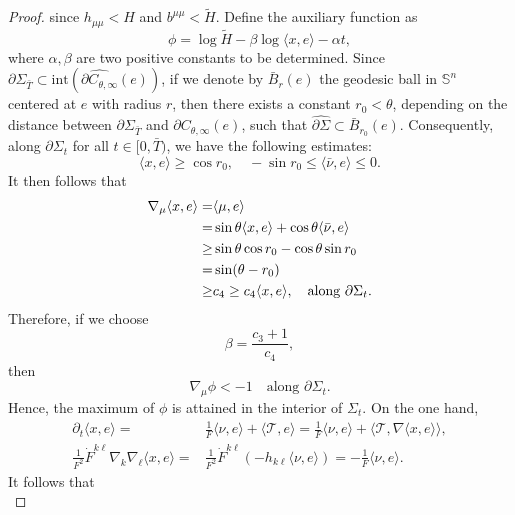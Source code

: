 \documentclass[11pt,reqno]{amsart}
\theoremstyle{definition}
\theoremstyle{remark}
\numberwithin{equation}{section}
\renewcommand{\(}{\left(}
\renewcommand{\)}{\right)}
\renewcommand{\-}{\overline}
\begin{document}
\begin{proof}
since $h_{\mu\mu}<H$ and $b^{\mu\mu}<\tilde{H}$. Define the auxiliary function as
\begin{equation}\label{fun-phi}
	\phi=\log\tilde{H}-\beta\log{\langle x,e \rangle}-\alpha t, 
\end{equation}
where $\alpha,\beta$ are two positive constants to be determined. Since $\partial\Sigma_{\bar{T}}\subset\mathrm{int}(\widehat{\partial C_{\theta,\infty}}(e))$,  if we denote by $\bar{B}_r(e)$ the geodesic ball in $\mathbb{S}^n$ centered at $e$ with radius $r$, then there exists a constant $r_0<\theta$,   depending on the distance between $\partial\Sigma_{\bar{T}}$ and $\partial C_{\theta,\infty}(e)$, such that $\widehat{\partial\Sigma}\subset\bar{B}_{r_0}(e)$. Consequently, along $\partial\Sigma_t$ for all $t\in[0,\bar{T})$, we have the following estimates:
\begin{equation*}
	\langle x,e\rangle\geq \cos r_0,\quad -\sin r_0\leq \langle \bar{\nu},e \rangle\leq 0.
\end{equation*}
It then follows that
\begin{align}
	\nabla_{\mu}\langle x,e\rangle=&\langle \mu,e\rangle\notag\\
	=&\sin\theta\langle x,e\rangle+\cos\theta\langle \bar{\nu},e \rangle\notag\\
	\geq& \sin\theta\cos r_0-\cos\theta\sin r_0\notag\\
	=&\sin(\theta-r_0)\notag\\
	\geq&c_4\geq c_4\langle x,e\rangle,\quad \text{along}\,\,\partial\Sigma_t.
\end{align}
Therefore, if we choose
\begin{equation}\label{defn-beta}
	\beta=\frac{c_3+1}{c_4},
\end{equation}
then 
\begin{equation}
	\nabla_{\mu}{\phi}<-1 \quad \text{along}\,\, \partial\Sigma_t.
\end{equation}
Hence, the maximum of $\phi$ is attained in the interior of $\Sigma_t$. On the one hand,
\begin{align*}
	\partial_t\langle x,e\rangle=&\frac{1}{F}\langle\nu,e\rangle+\langle \mathcal{T},e\rangle=\frac{1}{F}\langle\nu,e\rangle+\langle \mathcal{T},\nabla\langle x,e\rangle\rangle,\\
	\frac{1}{F^2}\dot{F}^{k\ell}\nabla_k\nabla_{\ell}\langle x,e\rangle=&\frac{1}{F^2}\dot{F}^{k\ell}(-h_{k\ell}\langle\nu,e\rangle)=-\frac{1}{F}\langle\nu,e\rangle.
\end{align*}
It follows that
\begin{equation}\label{Lheight}

\end{equation}
\end{proof}
\end{document}
